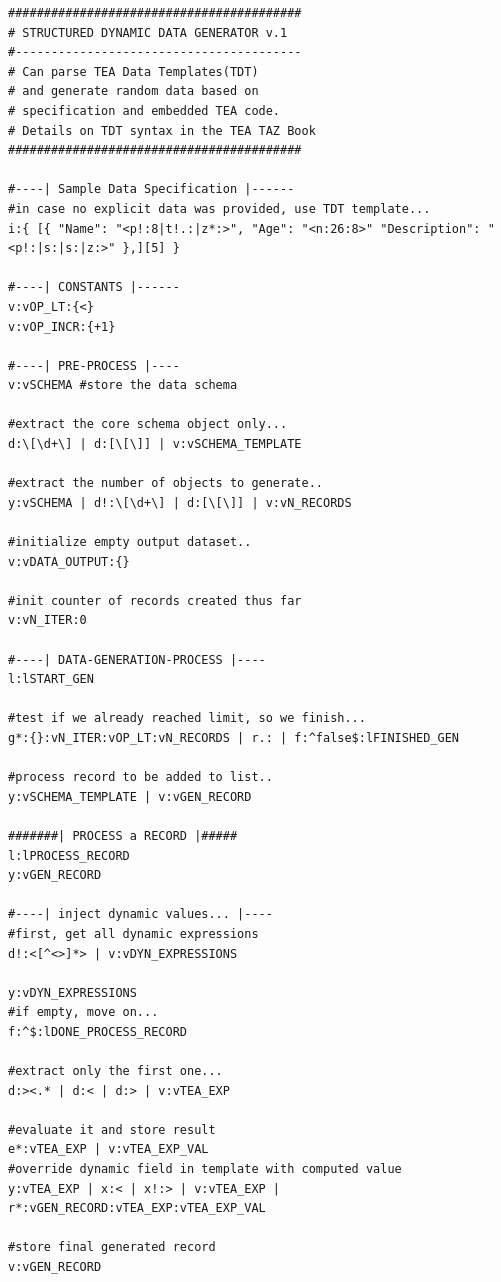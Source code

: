 \documentclass[a4paper, 18pt]{book} %
\begin{document}
{
  \begin{tcolorbox}[teaterminalstyle, title=TEA Program: TDT Processor and DATA Generator, breakable]
  \begin{lstlisting}[language=TEA,breaklines=true,]
#########################################
# STRUCTURED DYNAMIC DATA GENERATOR v.1
#----------------------------------------
# Can parse TEA Data Templates(TDT)
# and generate random data based on
# specification and embedded TEA code.
# Details on TDT syntax in the TEA TAZ Book
#########################################

#----| Sample Data Specification |------
#in case no explicit data was provided, use TDT template...
i:{ [{ "Name": "<p!:8|t!.:|z*:>", "Age": "<n:26:8>" "Description": "<p!:|s:|s:|z:>" },][5] }

#----| CONSTANTS |------
v:vOP_LT:{<}
v:vOP_INCR:{+1}

#----| PRE-PROCESS |----
v:vSCHEMA #store the data schema

#extract the core schema object only...
d:\[\d+\] | d:[\[\]] | v:vSCHEMA_TEMPLATE

#extract the number of objects to generate..
y:vSCHEMA | d!:\[\d+\] | d:[\[\]] | v:vN_RECORDS

#initialize empty output dataset..
v:vDATA_OUTPUT:{}

#init counter of records created thus far
v:vN_ITER:0

#----| DATA-GENERATION-PROCESS |----
l:lSTART_GEN

#test if we already reached limit, so we finish...
g*:{}:vN_ITER:vOP_LT:vN_RECORDS | r.: | f:^false$:lFINISHED_GEN

#process record to be added to list..
y:vSCHEMA_TEMPLATE | v:vGEN_RECORD

#######| PROCESS a RECORD |#####
l:lPROCESS_RECORD
y:vGEN_RECORD

#----| inject dynamic values... |----
#first, get all dynamic expressions
d!:<[^<>]*> | v:vDYN_EXPRESSIONS

y:vDYN_EXPRESSIONS
#if empty, move on...
f:^$:lDONE_PROCESS_RECORD

#extract only the first one...
d:><.* | d:< | d:> | v:vTEA_EXP 

#evaluate it and store result
e*:vTEA_EXP | v:vTEA_EXP_VAL
#override dynamic field in template with computed value
y:vTEA_EXP | x:< | x!:> | v:vTEA_EXP | r*:vGEN_RECORD:vTEA_EXP:vTEA_EXP_VAL

#store final generated record
v:vGEN_RECORD


\end{lstlisting}
\end{tcolorbox}}
\end{document}
